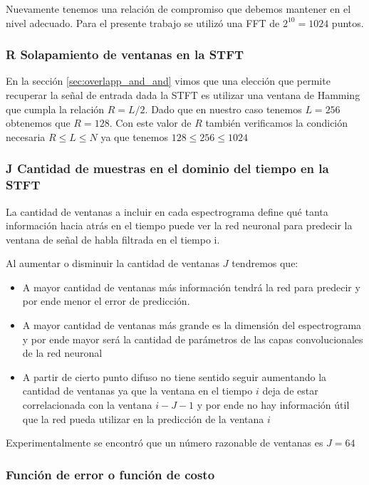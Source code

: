 Nuevamente tenemos una relación de compromiso que debemos mantener en el nivel adecuado. Para el presente trabajo se utilizó una FFT de $2^{10} = 1024$ puntos. 

\subsubsection{R Solapamiento de ventanas en la STFT}

En la sección \ref{sec:overlapp_and_and} vimos que una elección que permite recuperar la señal de entrada dada la STFT es utilizar una ventana de Hamming que cumpla la relación $R = L/2$. Dado que en nuestro caso tenemos $L = 256$ obtenemos que $R=128$. Con este valor de $R$ también verificamos la condición necesaria $R \leq L \leq N$ ya que tenemos $128 \leq 256 \leq 1024$

\subsubsection{J Cantidad de muestras en el dominio del tiempo en la STFT}
\label{sec:ventanas_en_espectrogramas}

La cantidad de ventanas a incluir en cada espectrograma define qué tanta información hacia atrás en el tiempo puede ver la red neuronal para predecir la ventana de señal de habla filtrada en el tiempo i. 

Al aumentar o disminuir la cantidad de ventanas $J$ tendremos que:

\begin{itemize}
	\item A mayor cantidad de ventanas más información tendrá la red para predecir y por ende menor el error de predicción.
	\item A mayor cantidad de ventanas más grande es la dimensión del espectrograma y por ende mayor será la cantidad de parámetros de las capas convolucionales de la red neuronal
	\item A partir de cierto punto difuso no tiene sentido seguir aumentando la cantidad de ventanas ya que la ventana en el tiempo $i$ deja de estar correlacionada con la ventana $i - J - 1$ y por ende no hay información útil que la red pueda utilizar en la predicción de la ventana $i$
\end{itemize}

Experimentalmente se encontró que un número razonable de ventanas es $J=64$

\subsubsection{Función de error o función de costo}

